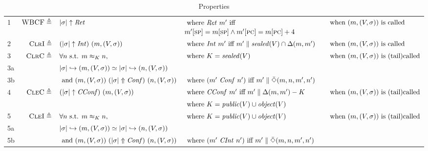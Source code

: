 \documentclass[10pt,conference]{ieeetran}%
\theoremstyle{definition}
\begin{document}
\begin{table}[h]
  \setlength{\tabcolsep}{1pt}
  \center
  \begin{tabular}{l r l l l}
    \rowcolor{black!20}
    1
    & \(\textnormal{\sc WBCF} \triangleq\) & \(|\sigma| \uparrow \mathit{Ret}\)
    & \(\textnormal{ where } \mathit{Ret} ~ m' \textnormal{ iff }\)
    \(m'[\textsc{sp}] = m[\textsc{sp}] \land m'[\textsc{pc}] = m[\textsc{pc}]+4\)
    & \(\textnormal{ when } (m,(V,\sigma)) \textnormal{ is called}\) \\
    \rowcolor{black!10}
    2
    & \(\textnormal{\sc ClrI} \triangleq\) & \((|\sigma| \uparrow \mathit{Int}) ~ (m,(V,\sigma))\)
    & \(\textnormal{ where } \mathit{Int} ~ m' \textnormal{ iff }
    m' \parallel \mathit{sealed}(V) \cap \Delta(m,m')\)
    & \(\textnormal{ when } (m,(V,\sigma)) \textnormal{ is called}\) \\
    \rowcolor{black!20}
    3
    & \(\textnormal{\sc ClrC} \triangleq\) & \(\forall n \textnormal{ s.t. } m \approx_{K} n,\)
    & \(\textnormal{ where } K = \mathit{sealed}(V)\)
    & \(\textnormal{ when } (m,(V,\sigma)) \textnormal{ is (tail)called}\) \\
    \rowcolor{black!20}
    3a & & \(|\sigma| \hookrightarrow (m,(V,\sigma)) \simeq |\sigma| \hookrightarrow (n,(V,\sigma))\) & & \\
    \rowcolor{black!20}
    3b & & \(\textnormal{ and } (m,(V,\sigma)) ~ (|\sigma| \Uparrow \mathit{Conf}) ~ (n,(V,\sigma))\)
    & \(\textnormal{ where } (m' ~ \mathit{Conf} ~ n') \textnormal{ iff }
    m' \parallel \bar{\Diamond}(m,n,m',n')\) & \\
    \rowcolor{black!10}
    4
    & \(\textnormal{\sc CleC} \triangleq\) & \((|\sigma| \uparrow \mathit{CConf}) ~ (m,(V,\sigma))\)
    & \(\textnormal{ where } \mathit{CConf} ~ m' \textnormal{ iff }
    m' \parallel \Delta(m,m') - K\)
    & \(\textnormal{ when } (m,(V,\sigma)) \textnormal{ is (tail)called}\) \\
    \rowcolor{black!10}
    & & & \(\textnormal{ where } K = \mathit{public}(V) \cup \mathit{object}(V)\) & \\
    \rowcolor{black!20}
    5
    & \(\textnormal{\sc CleI} \triangleq\) & \(\forall n \textnormal{ s.t. } m \approx_{K} n,\)
    & \(\textnormal{ where } K = \mathit{public}(V) \cup \mathit{object}(V)\)
    & \(\textnormal{ when } (m,(V,\sigma)) \textnormal{ is (tail)called}\) \\
    \rowcolor{black!20}
    5a & & \(|\sigma| \hookrightarrow (m,(V,\sigma)) \simeq |\sigma| \hookrightarrow (n,(V,\sigma))\) & & \\
    \rowcolor{black!20}
    5b & & \(\textnormal{ and } (m,(V,\sigma)) ~ (|\sigma| \Uparrow \mathit{Conf}) ~ (n,(V,\sigma))\)
    & \(\textnormal{ where } (m' ~ \mathit{CInt} ~ n') \textnormal{ iff }
    m' \parallel \bar{\Diamond}(m,n,m',n')\) & \\
  \end{tabular}
  \caption{Properties}
  \label{tab:props}
\end{table}
\end{document}
